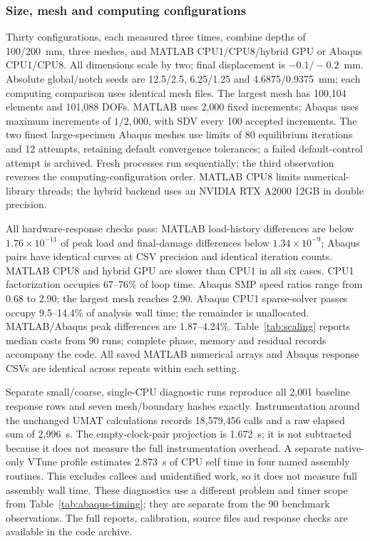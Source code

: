 \documentclass[preprint,11pt,a4paper]{elsarticle}
\begin{document}
\subsubsection*{Size, mesh and computing configurations}

Thirty configurations, each measured three times, combine depths of 100/200~mm, three meshes, and MATLAB
CPU1/CPU8/hybrid GPU or Abaqus CPU1/CPU8. All dimensions scale by two;
final displacement is $-0.1/-0.2$~mm. Absolute global/notch seeds are
12.5/2.5, 6.25/1.25 and 4.6875/0.9375~mm; each computing comparison
uses identical mesh files. The largest mesh has 100{,}104 elements and
101{,}088 DOFs. MATLAB uses 2{,}000 fixed increments; Abaqus uses maximum
increments of $1/2{,}000$, with SDV every 100 accepted increments.
The two finest large-specimen Abaqus meshes use limits of 80 equilibrium
iterations and 12 attempts, retaining default convergence tolerances;
a failed default-control attempt is archived. Fresh processes run
sequentially; the third observation reverses the computing-configuration order.
MATLAB CPU8 limits numerical-library
threads; the hybrid backend uses an NVIDIA RTX A2000 12GB in double precision.

All hardware-response checks pass: MATLAB load-history differences are
below $1.76\times10^{-11}$ of peak load and final-damage differences below
$1.34\times10^{-9}$; Abaqus pairs have identical curves at CSV precision
and identical iteration counts. MATLAB CPU8 and hybrid GPU are slower
than CPU1 in all six cases. CPU1 factorization occupies 67--76\% of loop time.
Abaqus SMP speed ratios range from 0.68 to 2.90; the largest mesh reaches
2.90. Abaqus CPU1 sparse-solver passes occupy 9.5--14.4\% of analysis wall
time; the remainder is unallocated. MATLAB/Abaqus peak differences are
1.87--4.24\%. Table~\ref{tab:scaling} reports
median costs from 90 runs; complete phase, memory and
residual records accompany the code. All saved MATLAB numerical arrays
and Abaqus response CSVs are identical across repeats within each setting.

Separate small/coarse, single-CPU diagnostic runs reproduce all 2{,}001 baseline response rows and seven mesh/boundary hashes exactly. Instrumentation around the unchanged UMAT calculations records 18{,}579{,}456 calls and a raw elapsed sum of 2.996~s. The empty-clock-pair projection is 1.672~s; it is not subtracted because it does not measure the full instrumentation overhead. A separate native-only VTune profile estimates 2.873~s of CPU self time in four named assembly routines. This excludes callees and unidentified work, so it does not measure full assembly wall time. These diagnostics use a different problem and timer scope from Table~\ref{tab:abaqus-timing}; they are separate from the 90 benchmark observations. The full reports, calibration, source files and response checks are available in the code archive.
\end{document}
